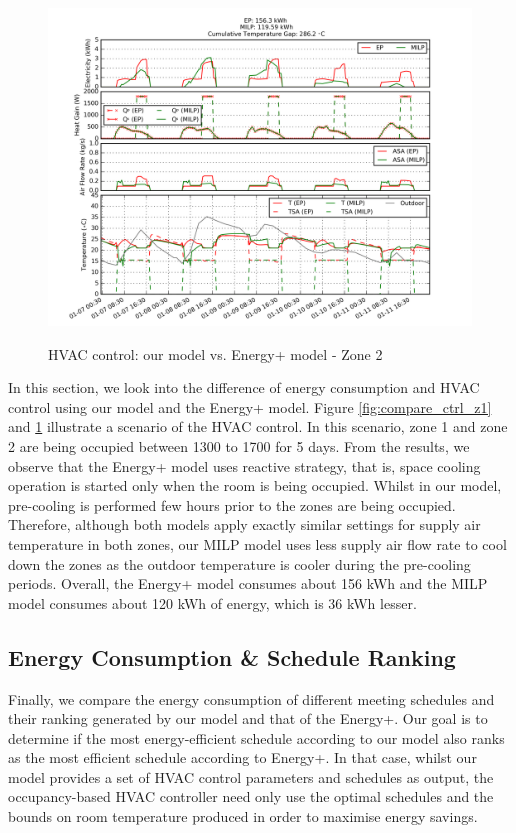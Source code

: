 \begin{figure} [h]
\centering
\includegraphics[width=0.8\linewidth]{figs/app_2R_hvac_13-17_R1R2_D7-12_2R_R1.png} \\
\caption{HVAC control: our model vs. Energy+ model - Zone 2}
\label{fig:compare_ctrl_z2}
\end{figure}

In this section, we look into the difference of energy consumption and HVAC control using our model and the Energy+ model. Figure \ref{fig:compare_ctrl_z1} and \ref{fig:compare_ctrl_z2} illustrate a scenario of the HVAC control. In this scenario, zone 1 and zone 2 are being occupied between 1300 to 1700 for 5 days. From the results, we observe that the Energy+ model uses reactive strategy, that is, space cooling operation is started only when the room is being occupied. Whilst in our model, pre-cooling is performed few hours prior to the zones are being occupied. Therefore, although both models apply exactly similar settings for supply air temperature in both zones, our MILP model uses less supply air flow rate to cool down the zones as the outdoor temperature is cooler during the pre-cooling periods. Overall, the Energy+ model consumes about 156 kWh and the MILP model consumes about 120 kWh of energy, which is 36 kWh lesser. 


\subsection{Energy Consumption \& Schedule Ranking}

Finally, 
we compare the energy consumption of different meeting schedules and their ranking generated by our model and that of the Energy+. Our goal is to determine if the most energy-efficient schedule according to our model also ranks as the most efficient schedule according to Energy+. In that case, whilst our model provides a set of HVAC control parameters and schedules as output, the occupancy-based HVAC controller need only use the optimal schedules and the bounds on room temperature produced in order to maximise energy savings. 


